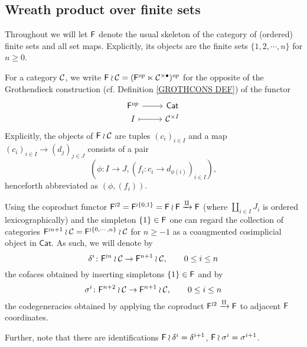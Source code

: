 \documentclass[a4paper,10pt]{article}%
\begin{document}
\subsection{Wreath product over finite sets}

Throughout we will let $\mathsf{F}$ denote the usual skeleton of the category of (ordered) finite sets and all set maps. Explicitly, its objects are the finite sets $\{1,2,\cdots,n\}$ for $n\geq 0$.


\begin{definition}
	For a category $\mathcal{C}$, we write 
	$\mathsf{F} \wr \mathcal{C} = (\mathsf{F}^{op} \ltimes \mathcal{C}^{\times \bullet})^{op}$ 
	for the opposite of the Grothendieck construction (cf. Definition \ref{GROTHCONS DEF}) of the functor
\[
\begin{tikzcd}[row sep=0pt]
	\Fin^{op} \ar{r} & \mathsf{Cat}
\\
	I \ar[r,mapsto] & \C^{\times I}
\end{tikzcd}	
 \]
Explicitly, the objects of $\mathsf{F} \wr \mathcal{C}$ are tuples $(c_i)_{i \in I}$ and a map 
$(c_i)_{i \in I} \to (d_j)_{j \in J}$ consists of a pair 
\[(\phi \colon I \to J, (f_i\colon c_i \to d_{\phi(i)})_{i\in I}),\]
 henceforth abbreviated as $(\phi,(f_i))$.
\end{definition}
 
 
\begin{notation}
Using the coproduct functor $\mathsf{F}^{\wr 2} = \mathsf{F}^{\wr \{{0,1\}}} =\mathsf{F} \wr \mathsf{F} \xrightarrow{\amalg} \mathsf{F}$ (where $\coprod_{i\in I} J_i$ is ordered lexicographically) and the simpleton $\{1\} \in \mathsf{F}$
one can regard the collection of categories 
$\mathsf{F}^{\wr n+1 }\wr \mathcal{C} = \mathsf{F}^{\wr \{0,\cdots,n\}} \wr \mathcal{C} $ for $n \geq -1$
 as a coaugmented cosimplicial object in $\mathsf{Cat}$.
As such, we will denote by
\[
	\delta^i\colon \mathsf{F}^{\wr n } \wr \mathcal{C} \to \mathsf{F}^{n+1} \wr \mathcal{C}, \qquad 0 \leq i \leq n
\]
the cofaces obtained by inserting simpletons $\{1\} \in \mathsf{F}$ and by 
\[
	\sigma^i \colon \mathsf{F}^{n+2} \wr \mathcal{C} \to \mathsf{F}^{n+1} \wr \mathcal{C}, \qquad 0 \leq i \leq n
\]
the codegeneracies obtained by applying the coproduct 
$\mathsf{F}^{\wr 2} \xrightarrow{\amalg} \mathsf{F}$ to adjacent 
$\mathsf{F}$ coordinates.

Further, note that there are identifications
$\mathsf{F} \wr \delta^{i} = \delta^{i+1}$, 
$\mathsf{F} \wr \sigma^{i} = \sigma^{i+1}$.
\end{notation}
 
\end{document}
